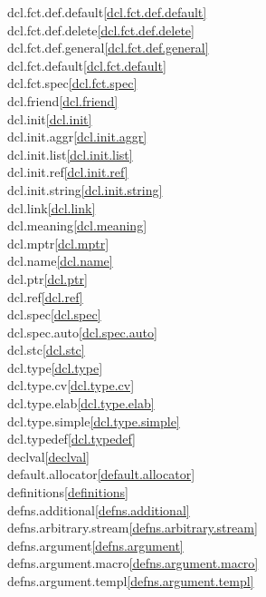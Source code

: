 \begin{multicols}{2}
dcl.fct.def.default\quad\ref{dcl.fct.def.default}\\
dcl.fct.def.delete\quad\ref{dcl.fct.def.delete}\\
dcl.fct.def.general\quad\ref{dcl.fct.def.general}\\
dcl.fct.default\quad\ref{dcl.fct.default}\\
dcl.fct.spec\quad\ref{dcl.fct.spec}\\
dcl.friend\quad\ref{dcl.friend}\\
dcl.init\quad\ref{dcl.init}\\
dcl.init.aggr\quad\ref{dcl.init.aggr}\\
dcl.init.list\quad\ref{dcl.init.list}\\
dcl.init.ref\quad\ref{dcl.init.ref}\\
dcl.init.string\quad\ref{dcl.init.string}\\
dcl.link\quad\ref{dcl.link}\\
dcl.meaning\quad\ref{dcl.meaning}\\
dcl.mptr\quad\ref{dcl.mptr}\\
dcl.name\quad\ref{dcl.name}\\
dcl.ptr\quad\ref{dcl.ptr}\\
dcl.ref\quad\ref{dcl.ref}\\
dcl.spec\quad\ref{dcl.spec}\\
dcl.spec.auto\quad\ref{dcl.spec.auto}\\
dcl.stc\quad\ref{dcl.stc}\\
dcl.type\quad\ref{dcl.type}\\
dcl.type.cv\quad\ref{dcl.type.cv}\\
dcl.type.elab\quad\ref{dcl.type.elab}\\
dcl.type.simple\quad\ref{dcl.type.simple}\\
dcl.typedef\quad\ref{dcl.typedef}\\
declval\quad\ref{declval}\\
default.allocator\quad\ref{default.allocator}\\
definitions\quad\ref{definitions}\\
defns.additional\quad\ref{defns.additional}\\
defns.arbitrary.stream\quad\ref{defns.arbitrary.stream}\\
defns.argument\quad\ref{defns.argument}\\
defns.argument.macro\quad\ref{defns.argument.macro}\\
defns.argument.templ\quad\ref{defns.argument.templ}\\

\end{multicols}
